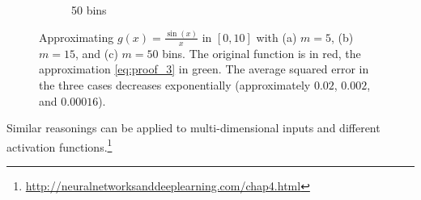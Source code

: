 \begin{figure}[t]
\begin{subfigure}[b]{0.32\textwidth}
    \caption{50 bins}
    \end{subfigure}
    \hfill
    \caption{Approximating $g(x) = \frac{\sin(x)}{x}$ in $[0,10]$ with (a) $m=5$, (b) $m=15$, and (c) $m=50$ bins. The original function is in red, the approximation \eqref{eq:proof_3} in green. The average squared error in the three cases decreases exponentially (approximately $0.02$, $0.002$, and $0.00016$).}
    \label{fig:sin_approximation}
\end{figure}

Similar reasonings can be applied to multi-dimensional inputs and different activation functions.\footnote{\url{http://neuralnetworksanddeeplearning.com/chap4.html}}